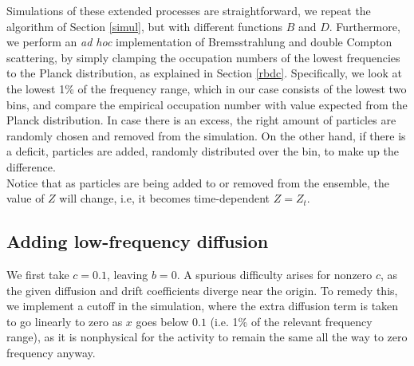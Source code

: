 \documentclass[a4paper,12pt,reqno,superscriptaddress,nofootinbib]{revtex4}
\theoremstyle{plain}
\theoremstyle{definition}
\theoremstyle{remark}
\newcommand{\0}{^{(0)}}
\newcommand{\1}{^{(1)}}
\newcommand{\2}{^{(2)}}
\begin{document}
Simulations of these extended processes are straightforward, we repeat the 
algorithm of Section \ref{simul}, but with different functions $B$ and $D$.  Furthermore, we perform an {\it ad hoc} implementation of Bremsstrahlung and double Compton scattering, by 
simply clamping the occupation numbers of the lowest frequencies to the Planck 
distribution, as explained in Section \ref{rbdc}. Specifically, we look at the 
lowest 1\% of the frequency range, which in our case consists of the lowest two 
bins, and compare the empirical occupation number with value expected from the 
Planck distribution. In case there is an excess, the right amount of particles 
are randomly chosen and removed from the simulation. On the other hand, if 
there is a deficit, particles are added, randomly distributed over the bin, to 
make up the difference.\\ 
Notice that as particles are being added to or removed from the ensemble, the 
value of $Z$ will change, i.e, it becomes time-dependent $Z=Z_t$.

\subsection{Adding low-frequency diffusion}

We first take $c = 0.1$, leaving $b=0$. A spurious difficulty arises for nonzero $c$, as the given diffusion and drift 
coefficients diverge near the origin. To remedy this, we implement a cutoff in the simulation,
where the extra diffusion term is taken to go linearly to zero as $x$ goes 
below $0.1$ (i.e. 1\% of the relevant frequency range), as it is nonphysical 
for the activity to remain the same all the way to zero frequency anyway.
\end{document}
